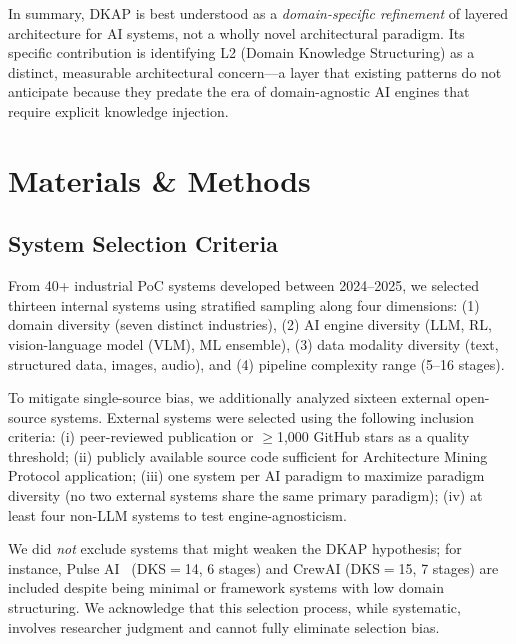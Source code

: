 \documentclass[fleqn,10pt,lineno]{wlpeerj}
\begin{document}
In summary, DKAP is best understood as a \textit{domain-specific refinement} of layered architecture for AI systems, not a wholly novel architectural paradigm. Its specific contribution is identifying L2 (Domain Knowledge Structuring) as a distinct, measurable architectural concern---a layer that existing patterns do not anticipate because they predate the era of domain-agnostic AI engines that require explicit knowledge injection.


\section{Materials \& Methods}


\subsection{System Selection Criteria}

From 40+ industrial PoC systems developed between 2024--2025, we selected thirteen internal systems using stratified sampling along four dimensions: (1) domain diversity (seven distinct industries), (2) AI engine diversity (LLM, RL, vision-language model (VLM), ML ensemble), (3) data modality diversity (text, structured data, images, audio), and (4) pipeline complexity range (5--16 stages).

To mitigate single-source bias, we additionally analyzed sixteen external open-source systems. External systems were selected using the following inclusion criteria: (i) peer-reviewed publication or $\geq$1,000 GitHub stars as a quality threshold; (ii) publicly available source code sufficient for Architecture Mining Protocol application; (iii) one system per AI paradigm to maximize paradigm diversity (no two external systems share the same primary paradigm); (iv) at least four non-LLM systems to test engine-agnosticism.

We did \textit{not} exclude systems that might weaken the DKAP hypothesis; for instance, Pulse AI~\citep{pulseai} (DKS$=$14, 6 stages) and CrewAI (DKS$=$15, 7 stages) are included despite being minimal or framework systems with low domain structuring. We acknowledge that this selection process, while systematic, involves researcher judgment and cannot fully eliminate selection bias.
\end{document}
